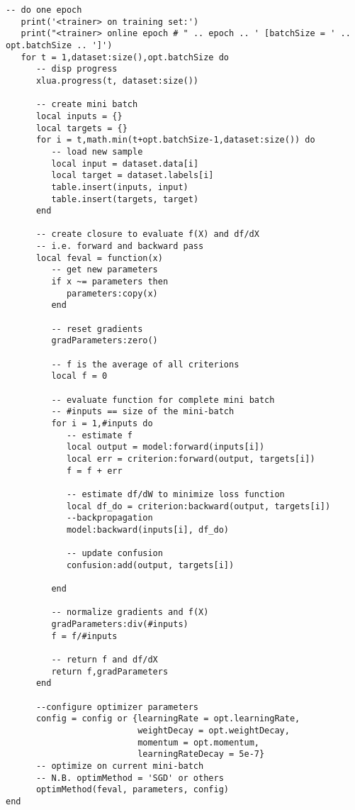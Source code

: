 \begin{lstlisting}[language={[5.2]Lua}]
   -- do one epoch
   print('<trainer> on training set:')
   print("<trainer> online epoch # " .. epoch .. ' [batchSize = ' .. opt.batchSize .. ']')
   for t = 1,dataset:size(),opt.batchSize do
      -- disp progress
      xlua.progress(t, dataset:size())

      -- create mini batch
      local inputs = {}
      local targets = {}
      for i = t,math.min(t+opt.batchSize-1,dataset:size()) do
         -- load new sample
         local input = dataset.data[i]
         local target = dataset.labels[i]
         table.insert(inputs, input)
         table.insert(targets, target)
      end

      -- create closure to evaluate f(X) and df/dX
      -- i.e. forward and backward pass
      local feval = function(x)
         -- get new parameters
         if x ~= parameters then
            parameters:copy(x)
         end

         -- reset gradients
         gradParameters:zero()

         -- f is the average of all criterions
         local f = 0

         -- evaluate function for complete mini batch
         -- #inputs == size of the mini-batch
         for i = 1,#inputs do
            -- estimate f
            local output = model:forward(inputs[i])
            local err = criterion:forward(output, targets[i])
            f = f + err

            -- estimate df/dW to minimize loss function
            local df_do = criterion:backward(output, targets[i])
            --backpropagation
            model:backward(inputs[i], df_do)

            -- update confusion
            confusion:add(output, targets[i])
            
         end

         -- normalize gradients and f(X)
         gradParameters:div(#inputs)
         f = f/#inputs

         -- return f and df/dX
         return f,gradParameters
      end

	  --configure optimizer parameters
      config = config or {learningRate = opt.learningRate,
           				  weightDecay = opt.weightDecay,
            		      momentum = opt.momentum,
            			  learningRateDecay = 5e-7}
      -- optimize on current mini-batch
      -- N.B. optimMethod = 'SGD' or others
      optimMethod(feval, parameters, config)
end
\end{lstlisting}
